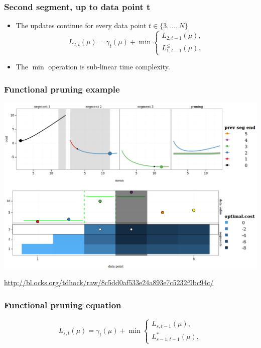 \documentclass{beamer}
\begin{document}
\begin{frame}
  \frametitle{Second segment, up to data point t}
  \begin{itemize}
\item The updates continue for every data point $t\in\{3, ..., N\}$
\begin{equation*}
  L_{2,t}(\mu) =  \gamma_t(\mu) + \min
  \begin{cases}
    L_{2,t-1}(\mu),\\
    L_{1,t-1}^{\leq}(\mu).
  \end{cases}
\end{equation*}
\item The $\min$ operation is sub-linear time complexity.
\end{itemize}
\end{frame}

\begin{frame}
  \frametitle{Functional pruning example}
\includegraphics[width=\textwidth]{screenshot-PDPA-demo}

  \url{http://bl.ocks.org/tdhock/raw/8c5dd0af533e24a893e7c5232f9bc94c/}
\end{frame}

\begin{frame}
  \frametitle{Functional pruning equation}
  \begin{equation*}
    L_{s,t}(\mu) = \gamma_t(\mu) + \min
    \begin{cases}
      L_{s,t-1}(\mu),\\
      L_{s-1,t-1}^{*}(\mu),
    \end{cases}
  \end{equation*}
\end{frame}
\end{document}
